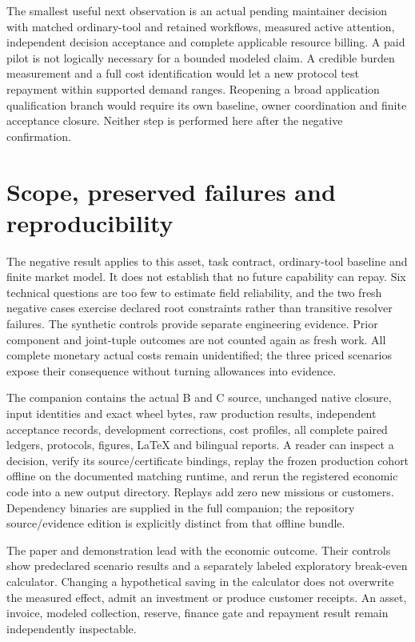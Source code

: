 \documentclass[11pt,letterpaper]{article}
\begin{document}
The smallest useful next observation is an actual pending maintainer decision with matched ordinary-tool and retained workflows, measured active attention, independent decision acceptance and complete applicable resource billing. A paid pilot is not logically necessary for a bounded modeled claim. A credible burden measurement and a full cost identification would let a new protocol test repayment within supported demand ranges. Reopening a broad application qualification branch would require its own baseline, owner coordination and finite acceptance closure. Neither step is performed here after the negative confirmation.

\section{Scope, preserved failures and reproducibility}

The negative result applies to this asset, task contract, ordinary-tool baseline and finite market model. It does not establish that no future capability can repay. Six technical questions are too few to estimate field reliability, and the two fresh negative cases exercise declared root constraints rather than transitive resolver failures. The synthetic controls provide separate engineering evidence. Prior component and joint-tuple outcomes are not counted again as fresh work. All complete monetary actual costs remain unidentified; the three priced scenarios expose their consequence without turning allowances into evidence.

The companion contains the actual B and C source, unchanged native closure, input identities and exact wheel bytes, raw production results, independent acceptance records, development corrections, cost profiles, all complete paired ledgers, protocols, figures, LaTeX and bilingual reports. A reader can inspect a decision, verify its source/certificate bindings, replay the frozen production cohort offline on the documented matching runtime, and rerun the registered economic code into a new output directory. Replays add zero new missions or customers. Dependency binaries are supplied in the full companion; the repository source/evidence edition is explicitly distinct from that offline bundle.

The paper and demonstration lead with the economic outcome. Their controls show predeclared scenario results and a separately labeled exploratory break-even calculator. Changing a hypothetical saving in the calculator does not overwrite the measured effect, admit an investment or produce customer receipts. An asset, invoice, modeled collection, reserve, finance gate and repayment result remain independently inspectable.
\end{document}

